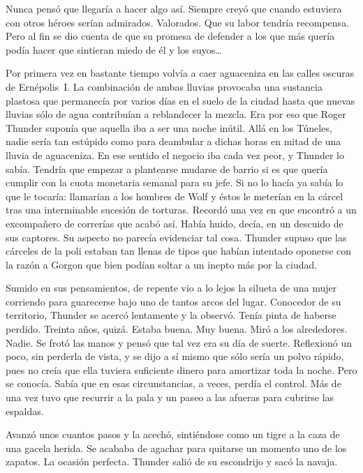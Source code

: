 \noindent
Nunca pensó que llegaría a hacer algo así. Siempre creyó que cuando estuviera con otros héroes serían admirados. Valorados. Que su labor tendría recompensa. Pero al fin se dio cuenta de que su promesa de defender a los que más quería podía hacer que sintieran miedo de él y los suyos\dots

\parbreak\noindent
Por primera vez en bastante tiempo volvía a caer aguaceniza en las calles oscuras de Ernépolis~I. La combinación de ambas lluvias provocaba una sustancia plastosa que permanecía por varios días en el suelo de la ciudad hasta que nuevas lluvias sólo de agua contribuían a reblandecer la mezcla. Era por eso que Roger Thunder suponía que aquella iba a ser una noche inútil. Allá en los Túneles, nadie sería tan estúpido como para deambular a dichas horas en mitad de una lluvia de aguaceniza. En ese sentido el negocio iba cada vez peor, y Thunder lo sabía. Tendría que empezar a plantearse mudarse de barrio si es que quería cumplir con la cuota monetaria semanal para su jefe. Si no lo hacía ya sabía lo que le tocaría: llamarían a los hombres de Wolf y éstos le meterían en la cárcel tras una interminable sucesión de torturas. Recordó una vez en que encontró a un excompañero de correrías que acabó así. Había huido, decía, en un descuido de sus captores. Su aspecto no parecía evidenciar tal cosa. Thunder supuso que las cárceles de la poli estaban tan llenas de tipos que habían intentado oponerse con la razón a Gorgon que bien podían soltar a un inepto más por la ciudad.

Sumido en sus pensamientos, de repente vio a lo lejos la silueta de una mujer corriendo para guarecerse bajo uno de tantos arcos del lugar. Conocedor de su territorio, Thunder se acercó lentamente y la observó. Tenía pinta de haberse perdido. Treinta años, quizá. Estaba buena. Muy buena. Miró a los alrededores. Nadie. Se frotó las manos y pensó que tal vez era su día de suerte. Reflexionó un poco, sin perderla de vista, y se dijo a sí mismo que sólo sería un polvo rápido, pues no creía que ella tuviera suficiente dinero para amortizar toda la noche. Pero se conocía. Sabía que en esas circunstancias, a veces, perdía el control. Más de una vez tuvo que recurrir a la pala y un paseo a las afueras para cubrirse las espaldas.

Avanzó unos cuantos pasos y la acechó, sintiéndose como un tigre a la caza de una gacela herida. Se acababa de agachar para quitarse un momento uno de los zapatos. La ocasión perfecta. Thunder salió de su escondrijo y sacó la navaja.

